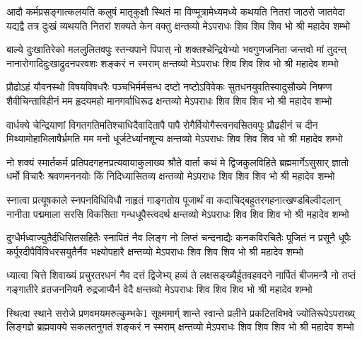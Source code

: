
\fourlineindentedshloka
{आदौ कर्मप्रसङ्गात्कलयति कलुषं मातृकुक्षौ स्थितं मा}
{विण्मूत्रामेध्यमध्ये कथयति नितरां जाठरो जातवेदा}
{यद्यद्वै तत्र दुःखं व्यथयति नितरां शक्यते केन वक्तु}
{क्षन्तव्यो मेऽपराधः शिव शिव शिव भो श्री महादेव शम्भो} %

\fourlineindentedshloka
{बाल्ये दुःखातिरेको मललुलितवपुः स्तन्यपाने पिपास्}
{नो शक्तश्चेन्द्रियेभ्यो भवगुणजनिता जन्तवो मां तुदन्त्}
{नानारोगादिदुःखाद्रुदनपरवशः शङ्करं न स्मराम्}
{क्षन्तव्यो मेऽपराधः शिव शिव शिव भो श्री महादेव शम्भो} %

\fourlineindentedshloka
{प्रौढोऽहं यौवनस्थो विषयविषधरैः पञ्चभिर्मर्मसन्ध}
{दष्टो नष्टोऽविवेकः सुतधनयुवतिस्वादुसौख्ये निषण्ण}
{शैवीचिन्ताविहीनं मम हृदयमहो मानगर्वाधिरूढ}
{क्षन्तव्यो मेऽपराधः शिव शिव शिव भो श्री महादेव शम्भो} %

\fourlineindentedshloka
{वार्धक्ये चेन्द्रियाणां विगतगतिमतिश्चाधिदैवादितापै}
{पापै रोगैर्वियोगैस्त्वनवसितवपुः प्रौढहीनं च दीन}
{मिथ्यामोहाभिलाषैर्भ्रमति मम मनो धूर्जटेर्ध्यानशून्य}
{क्षन्तव्यो मेऽपराधः शिव शिव शिव भो श्री महादेव शम्भो} %

\fourlineindentedshloka
{नो शक्यं स्मार्तकर्म प्रतिपदगहनप्रत्यवायाकुलाख्य}
{श्रौते वार्ता कथं मे द्विजकुलविहिते ब्रह्ममार्गेऽसुसार्}
{ज्ञातो धर्मो विचारैः श्रवणमननयोः किं निदिध्यासितव्य}
{क्षन्तव्यो मेऽपराधः शिव शिव शिव भो श्री महादेव शम्भो} %

\fourlineindentedshloka
{स्नात्वा प्रत्यूषकाले स्नपनविधिविधौ नाहृतं गाङ्गतोय}
{पूजार्थं वा कदाचिद्बहुतरगहनात्खण्डबिल्वीदलान्}
{नानीता पद्ममाला सरसि विकसिता गन्धधूपैस्त्वदर्थ}
{क्षन्तव्यो मेऽपराधः शिव शिव शिव भो श्री महादेव शम्भो} %

\fourlineindentedshloka
{दुग्धैर्मध्वाज्युतैर्दधिसितसहितैः स्नापितं नैव लिङ्ग}
{नो लिप्तं चन्दनाद्यैः कनकविरचितैः पूजितं न प्रसूनै}
{धूपैः कर्पूरदीपैर्विविधरसयुतैर्नैव भक्ष्योपहारै}
{क्षन्तव्यो मेऽपराधः शिव शिव शिव भो श्री महादेव शम्भो} %

\fourlineindentedshloka
{ध्यात्वा चित्ते शिवाख्यं प्रचुरतरधनं नैव दत्तं द्विजेभ्य्}
{हव्यं ते लक्षसङ्ख्यैर्हुतवहवदने नार्पितं बीजमन्त्रै}
{नो तप्तं गङ्गातीरे व्रतजननियमै रुद्रजाप्यैर्न वेदै}
{क्षन्तव्यो मेऽपराधः शिव शिव शिव भो श्री महादेव शम्भो} %

\fourlineindentedshloka
{स्थित्वा स्थाने सरोजे प्रणवमयमरुत्कुम्भके1 सूक्ष्ममार्ग्}
{शान्ते स्वान्ते प्रलीने प्रकटितविभवे ज्योतिरूपेऽपराख्य्}
{लिङ्गज्ञे ब्रह्मवाक्ये सकलतनुगतं शङ्करं न स्मराम्}
{क्षन्तव्यो मेऽपराधः शिव शिव शिव भो श्री महादेव शम्भो} %


